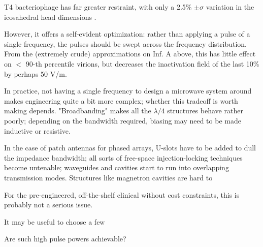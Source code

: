 \documentclass[paper.tex]{subfiles}
\begin{document}
T4 bacteriophage has far greater restraint, with only a 2.5\% $\pm \sigma$ variation in the icosahedral head dimensions \cite{Head1988}.\footnotemark


However, it offers a self-evident optimization: rather than applying a pulse of a single frequency, the pulses should be swept across the frequency distribution. From the (extremely crude) approximations on Inf. A above, this has little effect on $<$ 90-th percentile virions, but decreases the inactivation field of the last 10\% by perhaps 50 V/m.

In practice, not having a single frequency to design a microwave system around makes engineering quite a bit more complex; whether this tradeoff is worth making depends. "Broadbanding" makes all the $\lambda / 4$ structures behave rather poorly; depending on the bandwidth required, biasing may need to be made inductive or resistive.

In the case of patch antennas for phased arrays, U-slots have to be added to dull the impedance bandwidth; all sorts of free-space injection-locking techniques become untenable; waveguides and cavities start to run into overlapping transmission modes. Structures like magnetron cavities are hard to 

For the pre-engineered, off-the-shelf clinical without cost constraints, this is probably not a serious issue.

It may be useful to choose a few 

Are such high pulse powers achievable? 




	
\end{document}

